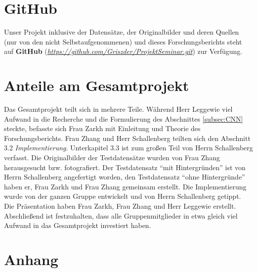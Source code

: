 \documentclass[paper=A4,pagesize=auto,12pt,headinclude=true,footinclude=true,BCOR=0mm,DIV=calc]{scrartcl}
\newcommand{\sectionspace}{
	\vspace{0.5cm}
}
\renewcommand{\listoffigures}{\begingroup
	\tocsection
	\tocfile{\listfigurename}{lof}
	\endgroup}
\renewcommand{\listoftables}{\begingroup
	\tocsection
	\tocfile{\listtablename}{lot}
	\endgroup}
\begin{document}
\newpage
\sectionspace
\section{GitHub}
Unser Projekt inklusive der Datensätze, der Originalbilder und deren Quellen (nur von den nicht Selbstaufgenommenen) und dieses Forschungsberichts steht auf \textbf{GitHub} (\hyperref{https://github.com/Griszder/ProjektSeminar.git}{}{}{\textit{https://github.com/Griszder/ProjektSeminar.git}}) zur Verfügung.

\sectionspace
\section{Anteile am Gesamtprojekt}
Das Gesamtprojekt teilt sich in mehrere Teile. Während Herr Leggewie viel Aufwand in die Recherche und die Formulierung des Abschnittes \ref{subsec:CNN} steckte, befasste sich Frau Zarkh mit Einleitung und Theorie des Forschungsberichts. Frau Zhang und Herr Schallenberg teilten sich den Abschnitt 3.2 \textit{Implementierung}. Unterkapitel 3.3 ist zum großen Teil von Herrn Schallenberg verfasst. Die Originalbilder der Testdatensätze wurden von Frau Zhang herausgesucht bzw. fotografiert. Der Testdatensatz ``mit Hintergründen'' ist von Herrn Schallenberg angefertigt worden, den Testdatensatz ``ohne Hintergründe'' haben er, Frau Zarkh und Frau Zhang gemeinsam erstellt. Die Implementierung wurde von der ganzen Gruppe entwickelt und von Herrn Schallenberg getippt. Die Präsentation haben Frau Zarkh, Frau Zhang und Herr Leggewie erstellt.\\
Abschließend ist festzuhalten, dass alle Gruppenmitglieder in etwa gleich viel Aufwand in das Gesamtprojekt investiert haben.

\newpage
\printbibliography[heading=bibnumbered]

\sectionspace
\listoffigures
\sectionspace
\listoftables

\sectionspace
\section{Anhang}
\end{document}
